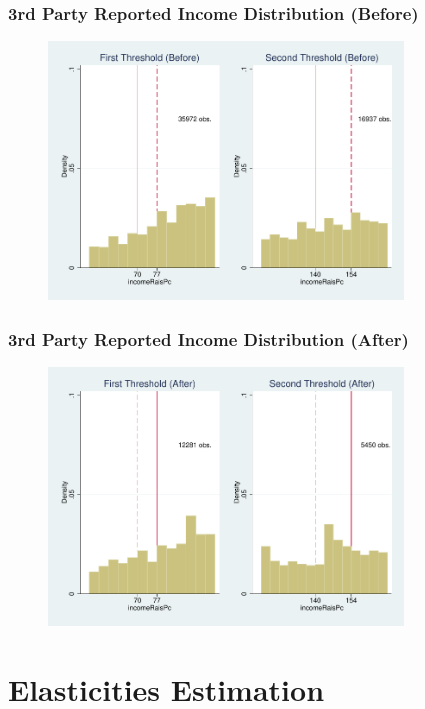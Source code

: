 \documentclass[xcolor=pdftex,dvipsnames,table]{beamer}
\begin{document}
\begin{frame}
\frametitle{3rd Party Reported Income Distribution (Before)}
\begin{figure}[H]
\begin{center}
\includegraphics[height=2.7in]{fig_raisRs_Before.pdf}
\end{center}
\end{figure}
\end{frame}

\begin{frame}
\frametitle{3rd Party Reported Income Distribution (After)}
\begin{figure}[H]
\begin{center}
\includegraphics[height=2.7in]{fig_raisRs_After.pdf}
\end{center}
\end{figure}
\end{frame}

\section{Elasticities Estimation}
\end{document}
